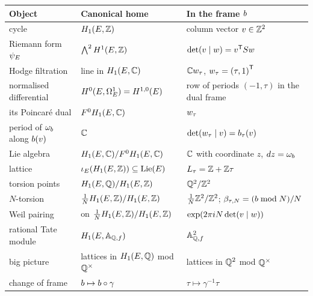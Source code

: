 \medskip
\noindent
\begin{tabular}{L{0.29\textwidth}L{0.33\textwidth}L{0.3\textwidth}}
\textbf{Object} & \textbf{Canonical home} & \textbf{In the frame $b$}\\ \hline
cycle & $H_{1}(E,\mathbb{Z})$ & column vector $v \in \mathbb{Z}^{2}$\\
Riemann form $\psi_{E}$ & $\textstyle\bigwedge^{2}H^{1}(E,\mathbb{Z})$ & $\det(v\mid w) = {v}^{\mathsf{T}}S w$\\
Hodge filtration & line in $H_{1}(E,\mathbb{C})$ & $\mathbb{C}w_{\tau}$, $w_{\tau} = {(\tau,1)}^{\mathsf{T}}$\\
normalised differential & $H^{0}(E,\Omega^{1}_{E}) = H^{1,0}(E)$ & row of periods $(-1, \tau)$ in the dual frame\\
its Poincar\'e dual & $F^{0}H_{1}(E,\mathbb{C})$ & $w_{\tau}$\\
period of $\omega_{b}$ along $b(v)$ & $\mathbb{C}$ & $\det(w_{\tau}\mid v) = b_{\tau}(v)$\\
Lie algebra & $H_{1}(E,\mathbb{C})/F^{0}H_{1}(E,\mathbb{C})$ & $\mathbb{C}$ with coordinate $z$, $dz = \omega_{b}$\\
lattice & $\iota_{E}(H_{1}(E,\mathbb{Z})) \subseteq \mathrm{Lie}(E)$ & $L_{\tau} = \mathbb{Z} + \mathbb{Z}\tau$\\
torsion points & $H_{1}(E,\mathbb{Q})/H_{1}(E,\mathbb{Z})$ & $\mathbb{Q}^{2}/\mathbb{Z}^{2}$\\
$N$-torsion & $\tfrac{1}{N}H_{1}(E,\mathbb{Z})/H_{1}(E,\mathbb{Z})$ & $\tfrac{1}{N}\mathbb{Z}^{2}/\mathbb{Z}^{2}$; $\beta_{\tau,N} = (b \bmod N)/N$\\
Weil pairing & on $\tfrac{1}{N}H_{1}(E,\mathbb{Z})/H_{1}(E,\mathbb{Z})$ & $\exp(2\pi i N\det(v\mid w))$\\
rational Tate module & $H_{1}(E,\mathbb{A}_{\mathbb{Q},f})$ & $\mathbb{A}_{\mathbb{Q},f}^{2}$\\
big picture & lattices in $H_{1}(E,\mathbb{Q})$ mod $\mathbb{Q}^{\times}$ & lattices in $\mathbb{Q}^{2}$ mod $\mathbb{Q}^{\times}$\\
change of frame & $b \mapsto b\circ\gamma$ & $\tau \mapsto \gamma^{-1}\tau$
\end{tabular}
\medskip
